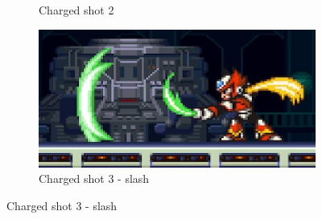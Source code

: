 \begin{figure}[htp]
\begin{subfigure}{0.4\linewidth}
		\caption{Charged shot 2}
	\end{subfigure}
	\begin{subfigure}{0.4\linewidth}
		\centering
		\includegraphics[width=\linewidth]{figures/X2/Hunter_stages/Zero_combo_3.png}
		\caption{Charged shot 3 - slash}
	\end{subfigure}
	

\end{figure}
